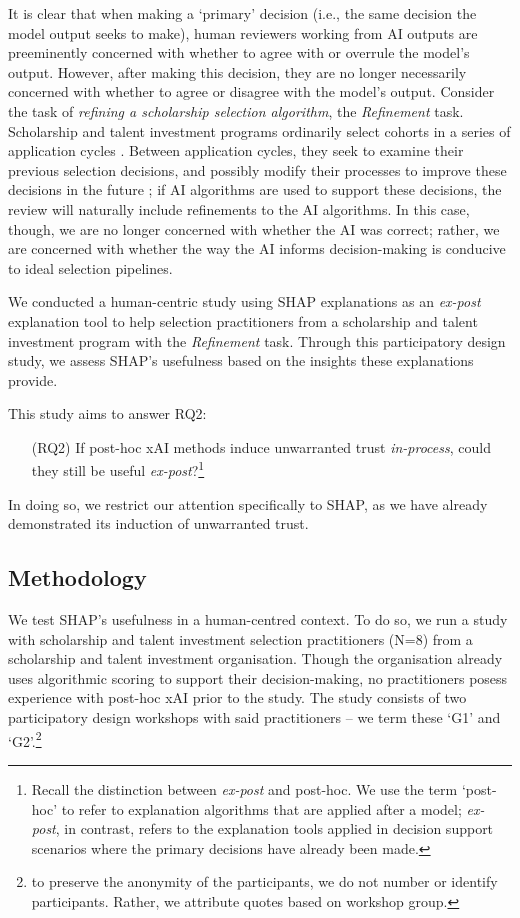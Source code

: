 It is clear that when making a `primary' decision (i.e., the same decision the model output seeks to make), human reviewers working from AI outputs are preeminently concerned with whether to agree with or overrule the model's output. However, after making this decision, they are no longer necessarily concerned with whether to agree or disagree with the model's output. Consider the task of \emph{refining a scholarship selection algorithm}, the \emph{Refinement} task. Scholarship and talent investment programs ordinarily select cohorts in a series of application cycles \cite{li2020hiring}. Between application cycles, they seek to examine their previous selection decisions, and possibly modify their processes to improve these decisions in the future \cite{li2020hiring}; if AI algorithms are used to support these decisions, the review will naturally include refinements to the AI algorithms. In this case, though, we are no longer concerned with whether the AI was correct; rather, we are concerned with whether the way the AI informs decision-making is conducive to ideal selection pipelines.

We conducted a human-centric study using SHAP explanations as an \emph{ex-post} explanation tool to help selection practitioners from a scholarship and talent investment program with the \emph{Refinement} task. Through this participatory design study, we assess SHAP's usefulness based on the insights these explanations provide.

This study aims to answer RQ2:

\begin{enumerate}
    \item[(RQ2)] If post-hoc xAI methods induce unwarranted trust \emph{in-process}, could they still be useful \emph{ex-post}?\footnote{Recall the distinction between \emph{ex-post} and post-hoc. We use the term `post-hoc' to refer to explanation algorithms that are applied after a model; \emph{ex-post}, in contrast, refers to the explanation tools applied in decision support scenarios where the primary decisions have already been made.}
\end{enumerate}

\noindent In doing so, we restrict our attention specifically to SHAP, as we have already demonstrated its induction of unwarranted trust.

\subsection{Methodology}\label{ssec:cs_methods}
We test SHAP's usefulness in a human-centred context. To do so, we run a study with scholarship and talent investment selection practitioners (N=8) from a scholarship and talent investment organisation. Though the organisation already uses algorithmic scoring to support their decision-making, no practitioners posess experience with post-hoc xAI prior to the study. The study consists of two participatory design workshops with said practitioners – we term these `G1' and `G2'.\footnote{to preserve the anonymity of the participants, we do not number or identify participants. Rather, we attribute quotes based on workshop group.}

